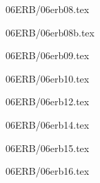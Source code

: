 \documentclass[9pt, xcolor={svgnames, x11names},professionalfonts]{beamer}
\def\scale{1}
\begin{document}
\begin{frame}{06ERB/06erb08.tex}	
		\def\scale{0.75}
		\tcb{
			
		}		
\end{frame}


\begin{frame}{06ERB/06erb08b.tex}	
		\def\scale{0.75}
		\tcb{
			
		}		
\end{frame}


\begin{frame}{06ERB/06erb09.tex}	
		\def\scale{0.625}
		\tcb{
			
		}		
\end{frame}


\begin{frame}{06ERB/06erb10.tex}	
		\def\scale{0.625}
		\tcb{
			
		}		
\end{frame}


\begin{frame}{06ERB/06erb12.tex}	
		\def\scale{0.625}
		\tcb{
			
		}		
\end{frame}


\begin{frame}{06ERB/06erb14.tex}	
	\def\scale{0.55}
	\tcb{
		\centering
		
	}			
\end{frame}

\begin{frame}{06ERB/06erb15.tex}	
	\def\scale{0.75}
	\tcb{
		\centering
		
	}			
\end{frame}


\begin{frame}{06ERB/06erb16.tex}	
	\def\scale{1}
	\tcb{
		\centering
		
	}
\end{frame}
\end{document}
